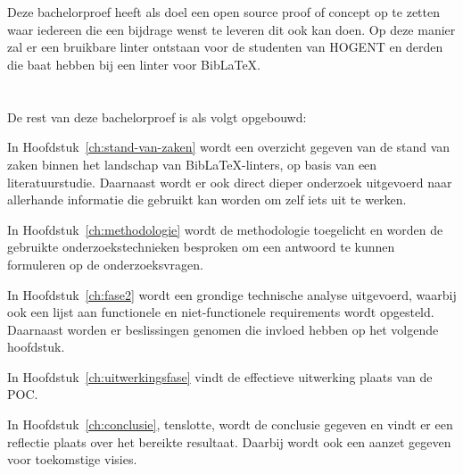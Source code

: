 
\section{}%
\label{sec:onderzoeksdoelstelling}
Deze bachelorproef heeft als doel een open source proof of concept op te zetten waar iedereen die een bijdrage wenst te leveren dit ook kan doen. Op deze manier zal er een bruikbare linter ontstaan voor de studenten van HOGENT en derden die baat hebben bij een linter voor BibLaTeX.

\section{} 
\label{sec:opzet-bachelorproef}


De rest van deze bachelorproef is als volgt opgebouwd:

In Hoofdstuk~\ref{ch:stand-van-zaken} wordt een overzicht gegeven van de stand van zaken binnen het landschap van BibLaTeX-linters, op basis van een literatuurstudie. Daarnaast wordt er ook direct dieper onderzoek uitgevoerd naar allerhande informatie die gebruikt kan worden om zelf iets uit te werken.

In Hoofdstuk~\ref{ch:methodologie} wordt de methodologie toegelicht en worden de gebruikte onderzoekstechnieken besproken om een antwoord te kunnen formuleren op de onderzoeksvragen.

In Hoofdstuk~\ref{ch:fase2} wordt een grondige technische analyse uitgevoerd, waarbij ook een lijst aan functionele en niet-functionele requirements wordt opgesteld. Daarnaast worden er beslissingen genomen die invloed hebben op het volgende hoofdstuk.

In Hoofdstuk~\ref{ch:uitwerkingsfase} vindt de effectieve uitwerking plaats van de \acrlong{POC}.

In Hoofdstuk~\ref{ch:conclusie}, tenslotte, wordt de conclusie gegeven en vindt er een reflectie plaats over het bereikte resultaat. Daarbij wordt ook een aanzet gegeven voor toekomstige visies.
